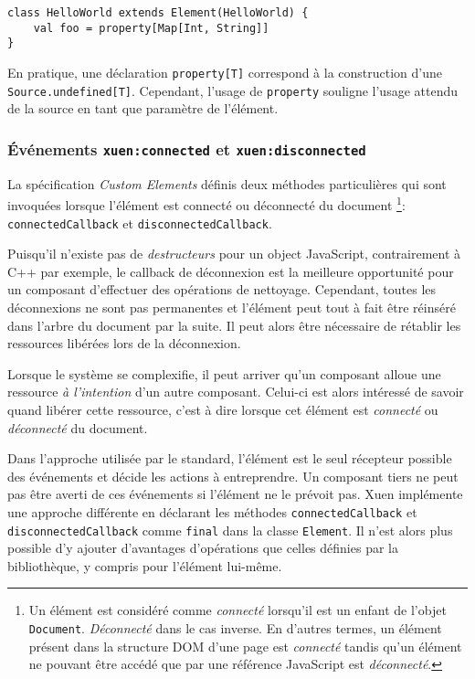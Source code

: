 \begin{lstlisting}
class HelloWorld extends Element(HelloWorld) {
	val foo = property[Map[Int, String]]
}
\end{lstlisting}

En pratique, une déclaration \texttt{property[T]} correspond à la construction d'une \texttt{Source.undefined[T]}. Cependant, l'usage de \texttt{property} souligne l'usage attendu de la source en tant que paramètre de l'élément.

\subsubsection{Événements \texttt{xuen:connected} et \texttt{xuen:disconnected}}

La spécification \emph{Custom Elements} définis deux méthodes particulières qui sont invoquées lorsque l'élément est connecté ou déconnecté du document \footnote{Un élément est considéré comme \emph{connecté} lorsqu'il est un enfant de l'objet \texttt{Document}. \emph{Déconnecté} dans le cas inverse. En d'autres termes, un élément présent dans la structure DOM d'une page est \emph{connecté} tandis qu'un élément ne pouvant être accédé que par une référence JavaScript est \emph{déconnecté}.}: \texttt{connectedCallback} et \texttt{disconnectedCallback}.

Puisqu'il n'existe pas de \emph{destructeurs} pour un object JavaScript, contrairement à C++ par exemple, le callback de déconnexion est la meilleure opportunité pour un composant d'effectuer des opérations de nettoyage. Cependant, toutes les déconnexions ne sont pas permanentes et l'élément peut tout à fait être réinséré dans l'arbre du document par la suite. Il peut alors être nécessaire de rétablir les ressources libérées lors de la déconnexion.

Lorsque le système se complexifie, il peut arriver qu'un composant alloue une ressource \emph{à l'intention} d'un autre composant. Celui-ci est alors intéressé de savoir quand libérer cette ressource, c'est à dire lorsque cet élément est \emph{connecté} ou \emph{déconnecté} du document.

Dans l'approche utilisée par le standard, l'élément est le seul récepteur possible des événements et décide les actions à entreprendre. Un composant tiers ne peut pas être averti de ces événements si l'élément ne le prévoit pas. Xuen implémente une approche différente en déclarant les méthodes \texttt{connectedCallback} et \texttt{disconnectedCallback} comme \texttt{final} dans la classe \texttt{Element}. Il n'est alors plus possible d'y ajouter d'avantages d'opérations que celles définies par la bibliothèque, y compris pour l'élément lui-même.

